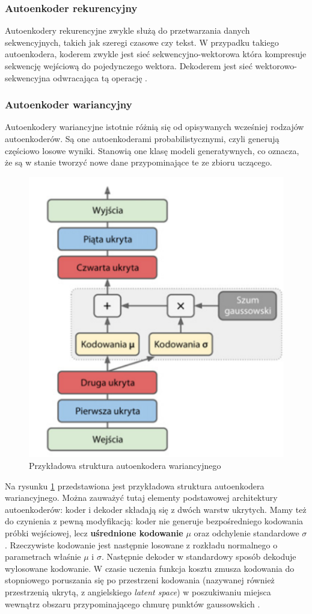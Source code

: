\documentclass[12pt]{mwbk}
\theoremstyle{plain}
\theoremstyle{definition}
\theoremstyle{remark}
\newcommand\zrodlo[1]{\par\vspace{-3mm}{\small\textit{Źródło: }#1 }}
\begin{document}
\subsubsection{Autoenkoder rekurencyjny}

Autoenkodery rekurencyjne zwykle służą do przetwarzania danych sekwencyjnych, takich jak szeregi czasowe czy tekst. W przypadku takiego autoenkodera, koderem zwykle jest sieć sekwencyjno-wektorowa która kompresuje sekwencję wejściową do pojedynczego wektora. Dekoderem jest sieć wektorowo-sekwencyjna odwracająca tą operację \cite{geron}.


\subsubsection{Autoenkoder wariancyjny}

Autoenkodery wariancyjne istotnie różnią się od opisywanych wcześniej rodzajów autoenkoderów. Są one autoenkoderami probabilistycznymi, czyli generują częściowo losowe wyniki. Stanowią one klasę modeli generatywnych, co oznacza, że są w stanie tworzyć nowe dane przypominające te ze zbioru uczącego. 




\begin{figure}[!h]
	\centering
	\includegraphics[width=0.5\linewidth]{rys/vae_structure.png}
	\caption{Przykładowa struktura autoenkodera wariancyjnego}
	\zrodlo{\cite{geron}}
	\label{fig:autoenkoder-wariancyjny}
\end{figure}


Na rysunku \ref{fig:autoenkoder-wariancyjny} przedstawiona jest przykładowa struktura autoenkodera wariancyjnego. Można zauważyć tutaj elementy podstawowej architektury autoenkoderów: koder i dekoder składają się z dwóch warstw ukrytych. Mamy też do czynienia z pewną modyfikacją: koder nie generuje bezpośredniego kodowania próbki wejściowej, lecz \textbf{uśrednione kodowanie} $\mu$ oraz odchylenie standardowe $\sigma$. Rzeczywiste kodowanie jest następnie losowane z rozkładu normalnego o parametrach właśnie $\mu$ i $\sigma$. Następnie dekoder w standardowy sposób dekoduje wylosowane kodowanie. W czasie uczenia funkcja kosztu zmusza kodowania do stopniowego poruszania się po przestrzeni kodowania (nazywanej również przestrzenią ukrytą, z angielskiego \emph{latent space}) w poszukiwaniu miejsca wewnątrz obszaru przypominającego chmurę punktów gaussowskich \cite{geron}.
\end{document}
